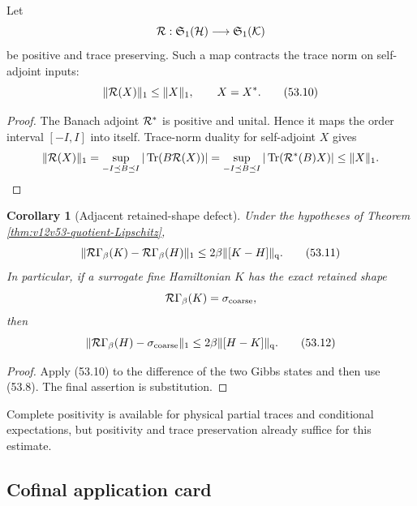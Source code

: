 \documentclass[11pt]{article}
\newtheorem{corollary}[theorem]{Corollary}
\theoremstyle{remark}
\begin{document}
Let
\[
 {\cal R}:{\mathfrak S}_1({\cal H})\longrightarrow
          {\mathfrak S}_1({\cal K})
\]
be positive and trace preserving.  Such a map contracts the trace
norm on self-adjoint inputs:
\begin{equation}
 \|{\cal R}(X)\|_1\leq\|X\|_1,
 \qquad X=X^*.                                    \tag{53.10}
\end{equation}

\begin{proof}
The Banach adjoint \({\cal R}^*\) is positive and unital.  Hence it
maps the order interval \([-I,I]\) into itself.  Trace-norm duality
for self-adjoint \(X\) gives
\[
 \|{\cal R}(X)\|_1
 =
 \sup_{-I\preceq B\preceq I}
 |\operatorname{Tr}(B{\cal R}(X))|
 =
 \sup_{-I\preceq B\preceq I}
 |\operatorname{Tr}({\cal R}^*(B)X)|
 \leq\|X\|_1.
\]
\end{proof}

\begin{corollary}[Adjacent retained-shape defect]
\label{cor:v12v53-retained}
Under the hypotheses of Theorem
\ref{thm:v12v53-quotient-Lipschitz},
\begin{equation}
 \|{\cal R}\Gamma_\beta(K)
      -{\cal R}\Gamma_\beta(H)\|_1
 \leq
 2\beta\|[K-H]\|_{\rm q}.                         \tag{53.11}
\end{equation}
In particular, if a surrogate fine Hamiltonian \(K\) has the exact
retained shape
\[
 {\cal R}\Gamma_\beta(K)=\sigma_{\rm coarse},
\]
then
\begin{equation}
 \|{\cal R}\Gamma_\beta(H)-\sigma_{\rm coarse}\|_1
 \leq
 2\beta\|[H-K]\|_{\rm q}.                         \tag{53.12}
\end{equation}
\end{corollary}

\begin{proof}
Apply (53.10) to the difference of the two Gibbs states and then use
(53.8).  The final assertion is substitution.
\end{proof}

Complete positivity is available for physical partial traces and
conditional expectations, but positivity and trace preservation
already suffice for this estimate.

\subsection{Cofinal application card}
\end{document}
